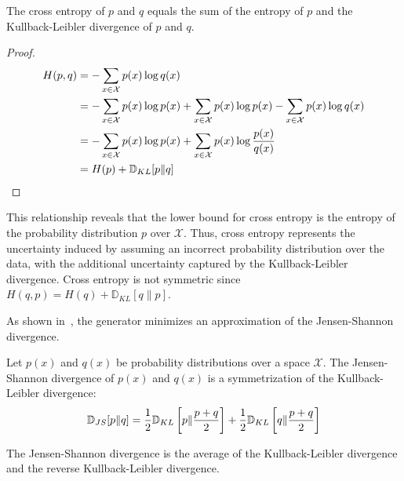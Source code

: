 \begin{lemma}
	The cross entropy of $p$ and $q$ equals the sum of the entropy of $p$ and the
	Kullback-Leibler divergence of $p$ and $q$.
\end{lemma}

\begin{proof}
	\begin{align}
		\label{eq:cross-entropy-alt}
		H(p, q) & = -\sum_{x \in \mathcal{X}} p(x) \log q(x)                                                                                     \\
		        & = -\sum_{x \in \mathcal{X}} p(x) \log p(x) + \sum_{x \in \mathcal{X}} p(x) \log p(x) - \sum_{x \in \mathcal{X}} p(x) \log q(x) \\
		        & = -\sum_{x \in \mathcal{X}} p(x) \log p(x) + \sum_{x \in \mathcal{X}} p(x) \log {p(x) \over q(x)}                              \\
		        & = H(p) + \mathbb{D}_{KL}[p \| q]
	\end{align}
\end{proof}

This relationship reveals that the lower bound for cross entropy is the entropy of the probability distribution $p$ over $\mathcal{X}$. Thus, cross entropy represents the uncertainty induced by assuming an incorrect probability distribution over the data, with the additional uncertainty captured by the Kullback-Leibler divergence. Cross entropy is not symmetric since $H(q, p) = H(q) + \mathbb{D}_{KL}[q \| p]$.

As shown in~\cite{ref:goodfellow-original}, the generator minimizes an approximation of the Jensen-Shannon divergence.

\begin{definition}%
	\label{def:jsd}
	Let $p(x)$ and $q(x)$ be probability distributions over a space $\mathcal{X}$. The \textnormal{\sffany Jensen-Shannon divergence} of
	$p(x)$ and $q(x)$ is a symmetrization of the Kullback-Leibler
	divergence:
	\begin{align}
		\mathbb{D}_{JS}[p \| q] = {1 \over 2} \mathbb{D}_{KL}\left[p \| {p + q \over 2}\right] + {1 \over 2} \mathbb{D}_{KL}\left[q \| {p + q \over 2}\right]
	\end{align}
\end{definition}

\begin{remark}
	The Jensen-Shannon divergence is the average of the Kullback-Leibler
	divergence and the reverse Kullback-Leibler divergence.
\end{remark}

